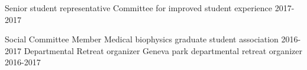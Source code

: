


\begin{cvhonors}


\cvhonor
{Senior student representative} %
{Committee for improved student experience} %
{}
{2017-2017} %
    

\cvhonor
{Social Committee Member} %
{Medical biophysics graduate student association} %
{}
{2016-2017} %
\cvhonor
{Departmental Retreat organizer} %
{Geneva park departmental retreat organizer} %
{}
{2016-2017} %
\end{cvhonors}
